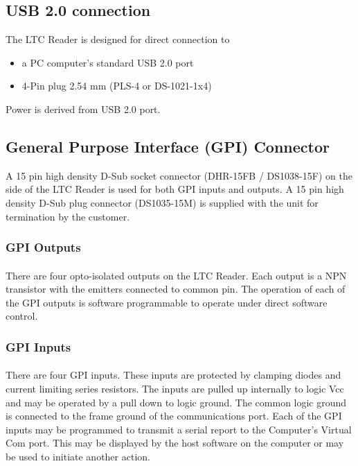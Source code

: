 \documentclass{article}
\begin{document}
		\subsection{USB 2.0 connection}\label{usb-2.0-connection}
			The LTC Reader is designed for direct connection to	
			\begin{itemize}
				\item
				a PC computer's standard USB 2.0 port
				\item
				4-Pin plug 2.54 mm (PLS-4 or DS-1021-1x4)
			\end{itemize}
			Power is derived from USB 2.0 port.
	
		\subsection{General Purpose Interface (GPI) Connector}\label{general-purpose-interface-gpi-connector}
			A 15 pin high density D-Sub socket connector (DHR-15FB / DS1038-15F) on the side of the LTC Reader is used for both GPI inputs and outputs. A 15 pin high density D-Sub plug connector (DS1035-15M) is supplied with the unit for termination by the customer.
	
		\subsubsection{GPI Outputs}\label{gpi-outputs}
			\paragraph{}
				There are four opto-isolated outputs on the LTC Reader. Each output is a NPN transistor with the emitters connected to common pin. The operation of each of the GPI outputs is software programmable to operate under direct software control.
	
		\subsubsection{GPI Inputs}\label{gpi-inputs}
			\paragraph{}
				There are four GPI inputs. These inputs are protected by clamping diodes 	and current limiting series resistors. The inputs are pulled up internally to logic Vcc and may be operated by a pull down to logic ground. The common logic ground is connected to the frame ground of the communications port. Each of the GPI inputs may be programmed to transmit a serial report to 	the Computer's Virtual Com port. This may be displayed by the host software on the computer or may be used to initiate another action.
		
\end{document}
